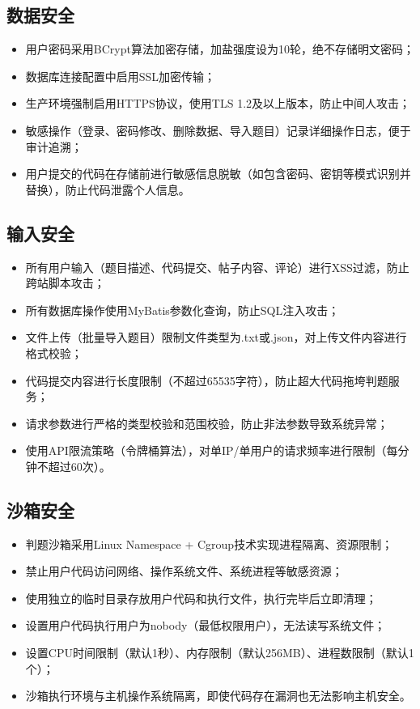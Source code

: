\documentclass{../template/softeng}
\begin{document}
\subsection{数据安全}
\begin{itemize}
	\item 用户密码采用BCrypt算法加密存储，加盐强度设为10轮，绝不存储明文密码；
	\item 数据库连接配置中启用SSL加密传输；
	\item 生产环境强制启用HTTPS协议，使用TLS 1.2及以上版本，防止中间人攻击；
	\item 敏感操作（登录、密码修改、删除数据、导入题目）记录详细操作日志，便于审计追溯；
	\item 用户提交的代码在存储前进行敏感信息脱敏（如包含密码、密钥等模式识别并替换），防止代码泄露个人信息。
\end{itemize}

\subsection{输入安全}
\begin{itemize}
	\item 所有用户输入（题目描述、代码提交、帖子内容、评论）进行XSS过滤，防止跨站脚本攻击；
	\item 所有数据库操作使用MyBatis参数化查询，防止SQL注入攻击；
	\item 文件上传（批量导入题目）限制文件类型为.txt或.json，对上传文件内容进行格式校验；
	\item 代码提交内容进行长度限制（不超过65535字符），防止超大代码拖垮判题服务；
	\item 请求参数进行严格的类型校验和范围校验，防止非法参数导致系统异常；
	\item 使用API限流策略（令牌桶算法），对单IP/单用户的请求频率进行限制（每分钟不超过60次）。
\end{itemize}

\subsection{沙箱安全}
\begin{itemize}
	\item 判题沙箱采用Linux Namespace + Cgroup技术实现进程隔离、资源限制；
	\item 禁止用户代码访问网络、操作系统文件、系统进程等敏感资源；
	\item 使用独立的临时目录存放用户代码和执行文件，执行完毕后立即清理；
	\item 设置用户代码执行用户为nobody（最低权限用户），无法读写系统文件；
	\item 设置CPU时间限制（默认1秒）、内存限制（默认256MB）、进程数限制（默认1个）；
	\item 沙箱执行环境与主机操作系统隔离，即使代码存在漏洞也无法影响主机安全。
\end{itemize}
\end{document}
